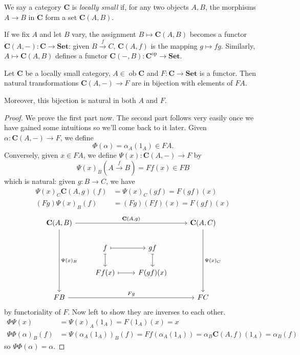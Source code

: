 \documentclass[a4paper]{article}
\renewcommand{\c}[1]{\mathbf{#1}}
\DeclareMathOperator{\ob}{ob}
\newcommand{\Set}{{\c{Set}}}
\begin{document}
\begin{definition}
  We say a category \(\c C\) is \emph{locally small} if, for any two objects \(A, B\), the morphisms \(A \to B\) in \(\c C\) form a set \(\c C(A, B)\).
\end{definition}

If we fix \(A\) and let \(B\) vary, the assignment \(B \mapsto \c C(A, B)\) becomes a functor \(\c C(A, -): \c C \to \Set\): given \(B \xrightarrow{f} C\), \(\c C(A, f)\) is the mapping \(g \mapsto fg\). Similarly, \(A \mapsto \c C(A, B)\) defines a functor \(\c C(-, B): \c C^{\text{op}} \to \Set\).

\begin{lemma}
  \label{lem:Yoneda}
  Let \(\c C\) be a locally small category, \(A \in \ob \c C\) and \(F: \c C \to \Set\) is a functor. Then natural transformations \(\c C(A, -) \to F\) are in bijection with elements of \(FA\).

  Moreover, this bijection is natural in both \(A\) and \(F\).
\end{lemma}

\begin{proof}
  We prove the first part now. The second part follows very easily once we have gained some intuitions so we'll come back to it later. Given \(\alpha: \c C(A, -) \to F\), we define
  \[
    \Phi(\alpha) = \alpha_A(1_A) \in FA.
  \]
  Conversely, given \(x \in FA\), we define \(\Psi(x): \c C(A, -) \to F\) by
  \[
    \Psi(x)_B (A \xrightarrow{f} B) = Ff(x) \in FB
  \]
  which is natural: given \(g: B \to C\), we have
  \begin{align*}
    \Psi(x)_C \c C(A, g)(f) &= \Psi(x)_C (gf) = F(gf) (x) \\
    (Fg) \Psi(x)_B (f) &= (Fg) (Ff)(x) = F(gf) (x)
  \end{align*}
  \[
    \begin{tikzcd}
      \c C(A, B) \ar[rrr, "{\c C(A, g)}"] \ar[ddd, "\Psi(x)_B"] &&& \c C(A, C) \ar[ddd, "\Psi(x)_C"] \\
      & f \ar[r, mapsto] \ar[d, mapsto] & gf \ar[d, mapsto] \\
      & Ff(x) \ar[r, mapsto] & F(gf)(x) \\
      FB \ar[rrr, "Fg"] &&& FC
    \end{tikzcd}
  \]
  by functoriality of \(F\). Now left to show they are inverses to each other.
  \begin{align*}
    \Phi\Psi(x) &= \Psi(x)_A(1_A) = F(1_A) (x) = x \\
    \Psi\Phi(\alpha)_B(f) &= \Psi (\alpha_A(1_A))_B (f) = Ff (\alpha_A(1_A)) = \alpha_B \c C(A, f) (1_A) = \alpha_B(f)
  \end{align*}
  so \(\Psi \Phi(\alpha) = \alpha\).
\end{proof}
\end{document}
